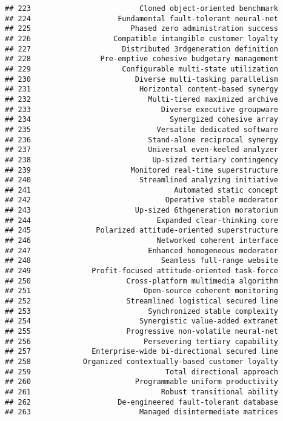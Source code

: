 \documentclass[
]{article}
\begin{document}
\begin{verbatim}
## 223                         Cloned object-oriented benchmark
## 224                    Fundamental fault-tolerant neural-net
## 225                       Phased zero administration success
## 226                   Compatible intangible customer loyalty
## 227                     Distributed 3rdgeneration definition
## 228                Pre-emptive cohesive budgetary management
## 229                     Configurable multi-state utilization
## 230                        Diverse multi-tasking parallelism
## 231                         Horizontal content-based synergy
## 232                           Multi-tiered maximized archive
## 233                              Diverse executive groupware
## 234                                Synergized cohesive array
## 235                             Versatile dedicated software
## 236                           Stand-alone reciprocal synergy
## 237                           Universal even-keeled analyzer
## 238                            Up-sized tertiary contingency
## 239                       Monitored real-time superstructure
## 240                         Streamlined analyzing initiative
## 241                                 Automated static concept
## 242                               Operative stable moderator
## 243                        Up-sized 6thgeneration moratorium
## 244                             Expanded clear-thinking core
## 245               Polarized attitude-oriented superstructure
## 246                             Networked coherent interface
## 247                           Enhanced homogeneous moderator
## 248                              Seamless full-range website
## 249              Profit-focused attitude-oriented task-force
## 250                      Cross-platform multimedia algorithm
## 251                          Open-source coherent monitoring
## 252                      Streamlined logistical secured line
## 253                           Synchronized stable complexity
## 254                         Synergistic value-added extranet
## 255                      Progressive non-volatile neural-net
## 256                          Persevering tertiary capability
## 257              Enterprise-wide bi-directional secured line
## 258            Organized contextually-based customer loyalty
## 259                               Total directional approach
## 260                        Programmable uniform productivity
## 261                              Robust transitional ability
## 262                    De-engineered fault-tolerant database
## 263                         Managed disintermediate matrices

\end{verbatim}
\end{document}
